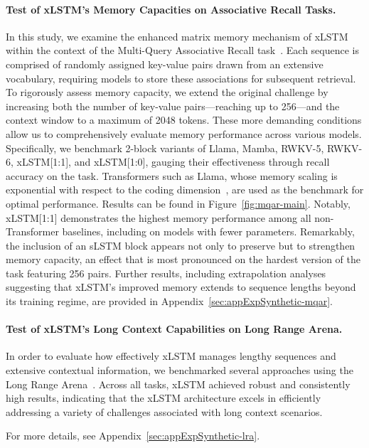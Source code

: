 \paragraph{Test of xLSTM's Memory Capacities on Associative Recall Tasks.} In this study, we examine the enhanced matrix memory mechanism of xLSTM within the context of the Multi-Query Associative Recall task~\citep{Arora:23arxiv}. Each sequence is comprised of randomly assigned key-value pairs drawn from an extensive vocabulary, requiring models to store these associations for subsequent retrieval. To rigorously assess memory capacity, we extend the original challenge by increasing both the number of key-value pairs—reaching up to 256—and the context window to a maximum of 2048 tokens. These more demanding conditions allow us to comprehensively evaluate memory performance across various models. Specifically, we benchmark 2-block variants of Llama, Mamba, RWKV-5, RWKV-6, xLSTM[1:1], and xLSTM[1:0], gauging their effectiveness through recall accuracy on the task. Transformers such as Llama, whose memory scaling is exponential with respect to the coding dimension~\citep{Ramsauer:21}, are used as the benchmark for optimal performance. Results can be found in Figure~\ref{fig:mqar-main}. Notably, xLSTM[1:1] demonstrates the highest memory performance among all non-Transformer baselines, including on models with fewer parameters. Remarkably, the inclusion of an sLSTM block appears not only to preserve but to strengthen memory capacity, an effect that is most pronounced on the hardest version of the task featuring 256 pairs. Further results, including extrapolation analyses suggesting that xLSTM's improved memory extends to sequence lengths beyond its training regime, are provided in Appendix~\ref{sec:appExpSynthetic-mqar}.

\paragraph{Test of xLSTM's Long Context Capabilities on Long Range Arena.} In order to evaluate how effectively xLSTM manages lengthy sequences and extensive contextual information, we benchmarked several approaches using the Long Range Arena~\citep{Tay:21}. Across all tasks, xLSTM achieved robust and consistently high results, indicating that the xLSTM architecture excels in efficiently addressing a variety of challenges associated with long context scenarios.

For more details, see Appendix~\ref{sec:appExpSynthetic-lra}.

